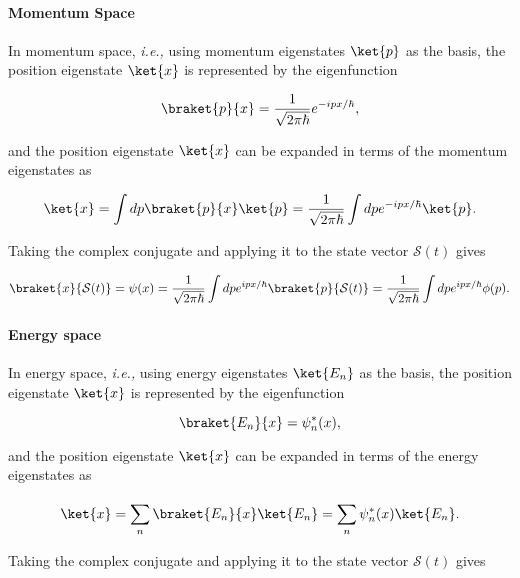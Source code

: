 \documentclass[a4paper,12pt]{report}
\begin{document}
\paragraph{Momentum Space}

In momentum space, \textit{i.e.,} using momentum eigenstates \(\ket{p} \) as the basis, the position eigenstate \(\ket{x} \) is represented by the eigenfunction

\begin{equation}
  \braket{p}{x} = \frac{1}{\sqrt{2\pi \hbar } } e^{-ipx /\hbar },
\end{equation}

and the position eigenstate \(\ket{x} \) can be expanded in terms of the momentum eigenstates as

\begin{equation}
  \ket{x} = \int dp \braket{p}{x} \ket{p} = \frac{1}{\sqrt{2\pi \hbar } } \int dp e^{-ipx /\hbar } \ket{p} .    
\end{equation}

Taking the complex conjugate and applying it to the state vector \(\mathcal{S}(t)\) gives 

\begin{equation}
  \braket{x}{\mathcal{S}(t)} = \psi (x) = \frac{1}{\sqrt{2\pi \hbar } } \int dp e^{ipx /\hbar } \braket{p}{\mathcal{S}(t)} = \frac{1}{\sqrt{2\pi \hbar } }  \int dp e^{ipx /\hbar } \phi (p).   \label{posmom} 
\end{equation}

\paragraph{Energy space}

In energy space, \textit{i.e.,} using energy eigenstates \(\ket{E_{n} } \) as the basis, the position eigenstate \(\ket{x} \) is represented by the eigenfunction 

\begin{equation}
  \braket{E_{n} }{x} = \psi _{n}^*(x),
\end{equation}

and the position eigenstate \(\ket{x} \) can be expanded in terms of the energy eigenstates as 

\begin{equation}
  \ket{x} = \sum_{n}^{} \braket{E_{n} }{x} \ket{E_{n} } = \sum_{n}^{} \psi _{n}^*(x) \ket{E_{n} }.       
\end{equation}

Taking the complex conjugate and applying it to the state vector \(\mathcal{S}(t)\) gives 
\end{document}
